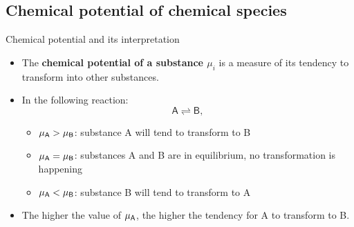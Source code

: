 \subsection{Chemical potential of chemical species}
%
\begin{frame}{Chemical potential and its interpretation}

\begin{itemize}
\item The \textbf{chemical potential of a substance $\mu_{i}$} is a measure of
its tendency to transform into other substances.
\pause
\item In the following reaction:
\[
\mathsf{A\rightleftharpoons B},
\]

\begin{itemize}
\item $\mu_{\sf A}>\mu_{\sf B}$: substance A will tend to transform to B 
\item $\mu_{\sf A}=\mu_{\sf B}$: substances A and B are in equilibrium, no
transformation is happening
\item $\mu_{\sf A}<\mu_{\sf B}$: substance B will tend to transform to A
\end{itemize}
\pause
\item The higher the value of $\mu_{\sf A}$, the higher the tendency for A
to transform to B.
\end{itemize}
\end{frame}
%
%
